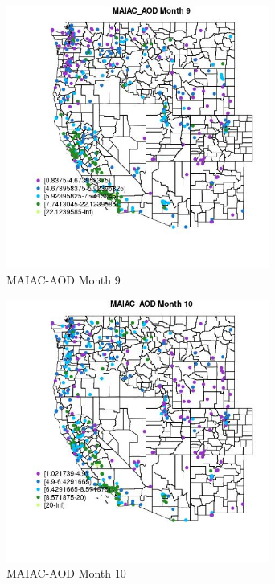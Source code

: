 \begin{figure} 
\centering  
\includegraphics[width=0.77\textwidth]{Code_Outputs/ML_input_report_ML_input_PM25_Step5_part_d_de_duplicated_aves_ML_input_MapObsMo9MAIAC_AOD.jpg} 
\caption{\label{fig:ML_input_report_ML_input_PM25_Step5_part_d_de_duplicated_aves_ML_inputMapObsMo9MAIAC_AOD}MAIAC-AOD Month 9} 
\end{figure} 
 

\begin{figure} 
\centering  
\includegraphics[width=0.77\textwidth]{Code_Outputs/ML_input_report_ML_input_PM25_Step5_part_d_de_duplicated_aves_ML_input_MapObsMo10MAIAC_AOD.jpg} 
\caption{\label{fig:ML_input_report_ML_input_PM25_Step5_part_d_de_duplicated_aves_ML_inputMapObsMo10MAIAC_AOD}MAIAC-AOD Month 10} 
\end{figure} 
 

